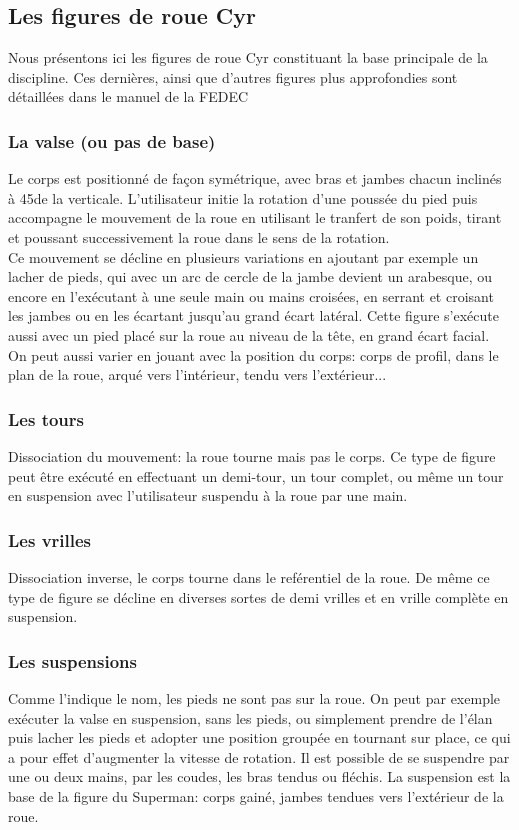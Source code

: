 \subsection{Les figures de roue Cyr}
Nous présentons ici les figures de roue Cyr constituant la base principale de la discipline. Ces dernières, ainsi que d'autres figures plus approfondies sont détaillées dans le manuel de la FEDEC \cite{Fedec2011}
\subsubsection{La valse (ou pas de base)}
Le corps est positionné de façon symétrique, avec bras et jambes chacun inclinés à 45\degree de la verticale. L'utilisateur initie la rotation d'une poussée du pied puis accompagne le mouvement de la roue en utilisant le tranfert de son poids, tirant et poussant successivement la roue dans le sens de la rotation.\\
Ce mouvement se décline en plusieurs variations en ajoutant par exemple un lacher de pieds, qui avec un arc de cercle de la jambe devient un arabesque, ou encore en l'exécutant à une seule main ou mains croisées, en serrant et croisant les jambes ou en les écartant jusqu'au grand écart latéral. Cette figure s'exécute aussi avec un pied placé sur la roue au niveau de la tête, en grand écart facial. On peut aussi varier en jouant avec la position du corps: corps de profil, dans le plan de la roue, arqué vers l'intérieur, tendu vers l'extérieur...

\subsubsection{Les tours}
Dissociation du mouvement: la roue tourne mais pas le corps. Ce type de figure peut être exécuté en effectuant un demi-tour, un tour complet, ou même un tour en suspension avec l'utilisateur suspendu à la roue par une main.

\subsubsection{Les vrilles}
Dissociation inverse, le corps tourne dans le reférentiel de la roue. De même ce type de figure se décline en diverses sortes de demi vrilles et en vrille complète en suspension.

\subsubsection{Les suspensions}
Comme l'indique le nom, les pieds ne sont pas sur la roue. On peut par exemple exécuter la valse en suspension, sans les pieds, ou simplement prendre de l'élan puis lacher les pieds et adopter une position groupée en tournant sur place, ce qui a pour effet d'augmenter la vitesse de rotation. Il est possible de se suspendre par une ou deux mains, par les coudes, les bras tendus ou fléchis. La suspension est la base de la figure du Superman: corps gainé, jambes tendues vers l'extérieur de la roue.

